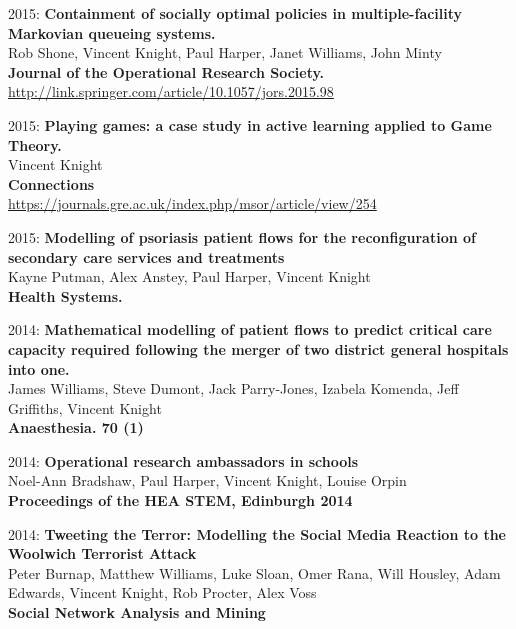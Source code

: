 \documentclass[10pt]{res} %
\begin{document}
\begin{resume}
\begin{etaremune}
\item
2015: \textbf{Containment of socially optimal policies in multiple-facility Markovian queueing systems.}\\
Rob Shone, Vincent Knight, Paul Harper, Janet Williams, John Minty
\\
\textbf{Journal of the Operational Research Society.}
\\
\url{http://link.springer.com/article/10.1057/jors.2015.98}
\\

\item
2015: \textbf{Playing games: a case study in active learning applied to Game Theory.}\\
Vincent Knight
\\
\textbf{Connections}
\\
\url{https://journals.gre.ac.uk/index.php/msor/article/view/254}
\\

\item
2015: \textbf{Modelling of psoriasis patient flows for the reconfiguration of secondary care services and treatments}\\
Kayne Putman, Alex Anstey, Paul Harper, Vincent Knight
\\
\textbf{Health Systems.}
\\

\item
2014: \textbf{Mathematical modelling of patient flows to predict critical care capacity required following the merger of two district general hospitals into one.}\\
James Williams, Steve Dumont, Jack Parry-Jones, Izabela Komenda, Jeff Griffiths, Vincent Knight
\\
\textbf{Anaesthesia. 70 (1)}
\\

\item
2014: \textbf{Operational research ambassadors in schools}\\
Noel-Ann Bradshaw, Paul Harper, Vincent Knight, Louise Orpin
\\
\textbf{Proceedings of the HEA STEM, Edinburgh 2014}
\\

\item
2014: \textbf{Tweeting the Terror: Modelling the Social Media Reaction to the Woolwich Terrorist Attack}\\
Peter Burnap, Matthew Williams, Luke Sloan, Omer Rana, Will Housley, Adam Edwards, Vincent Knight, Rob Procter, Alex Voss
\\
\textbf{Social Network Analysis and Mining}
\\


\end{etaremune}
\end{resume}
\end{document}
